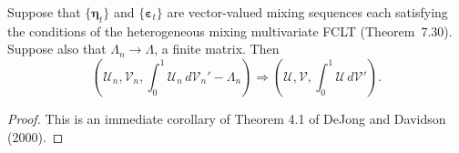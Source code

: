 \begin{theorem}\label{thm:het-mixing-stoch-int}
Suppose that $\{\boldsymbol{\eta}_t\}$ and $\{\boldsymbol{\varepsilon}_t\}$ are vector-valued mixing sequences each satisfying the conditions of the heterogeneous mixing multivariate FCLT (Theorem~7.30). Suppose also that $\Lambda_n \to \Lambda$, a finite matrix. Then
\[
\left(\boldsymbol{\mathcal{U}}_n, \boldsymbol{\mathcal{V}}_n, \int_0^1 \boldsymbol{\mathcal{U}}_n\,d\boldsymbol{\mathcal{V}}_n' - \Lambda_n\right) \Rightarrow \left(\boldsymbol{\mathcal{U}}, \boldsymbol{\mathcal{V}}, \int_0^1 \boldsymbol{\mathcal{U}}\,d\boldsymbol{\mathcal{V}}'\right).
\]
\end{theorem}

\begin{proof}
This is an immediate corollary of Theorem 4.1 of DeJong and Davidson (2000).
\end{proof}

